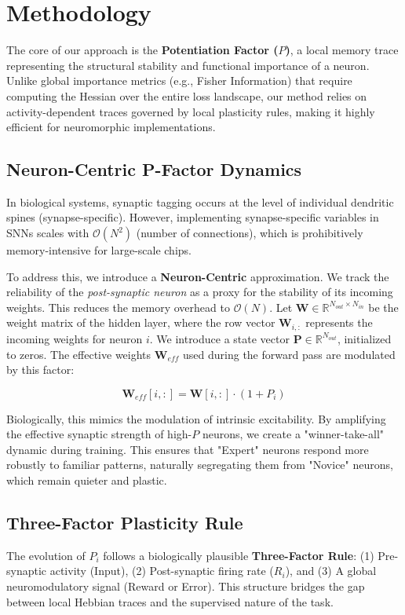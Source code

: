 \documentclass[5p,times]{elsarticle}
\begin{document}
\section{Methodology}

The core of our approach is the \textbf{Potentiation Factor ($P$)}, a local memory trace representing the structural stability and functional importance of a neuron. Unlike global importance metrics (e.g., Fisher Information) that require computing the Hessian over the entire loss landscape, our method relies on activity-dependent traces governed by local plasticity rules, making it highly efficient for neuromorphic implementations.

\subsection{Neuron-Centric P-Factor Dynamics}
In biological systems, synaptic tagging occurs at the level of individual dendritic spines (synapse-specific). However, implementing synapse-specific variables in SNNs scales with $\mathcal{O}(N^2)$ (number of connections), which is prohibitively memory-intensive for large-scale chips.

To address this, we introduce a \textbf{Neuron-Centric} approximation. We track the reliability of the \textit{post-synaptic neuron} as a proxy for the stability of its incoming weights. This reduces the memory overhead to $\mathcal{O}(N)$. 
Let $\mathbf{W} \in \mathbb{R}^{N_{out} \times N_{in}}$ be the weight matrix of the hidden layer, where the row vector $\mathbf{W}_{i,:}$ represents the incoming weights for neuron $i$. We introduce a state vector $\mathbf{P} \in \mathbb{R}^{N_{out}}$, initialized to zeros. The effective weights $\mathbf{W}_{eff}$ used during the forward pass are modulated by this factor:

\begin{equation}
    \mathbf{W}_{eff}[i, :] = \mathbf{W}[i, :] \cdot (1 + P_i)
\end{equation}

Biologically, this mimics the modulation of intrinsic excitability. By amplifying the effective synaptic strength of high-$P$ neurons, we create a "winner-take-all" dynamic during training. This ensures that "Expert" neurons respond more robustly to familiar patterns, naturally segregating them from "Novice" neurons, which remain quieter and plastic.

\subsection{Three-Factor Plasticity Rule}
The evolution of $P_i$ follows a biologically plausible \textbf{Three-Factor Rule}: (1) Pre-synaptic activity (Input), (2) Post-synaptic firing rate ($R_i$), and (3) A global neuromodulatory signal (Reward or Error). This structure bridges the gap between local Hebbian traces and the supervised nature of the task.
\end{document}
